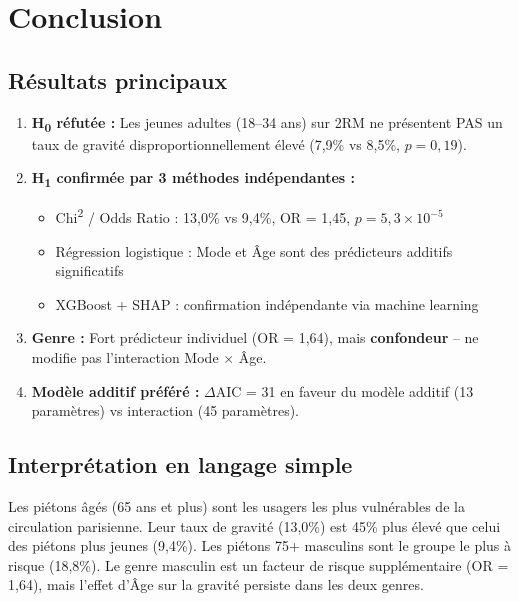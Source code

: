 \documentclass[12pt,a4paper]{article}
\begin{document}
\section{Conclusion}

\subsection{R\'{e}sultats principaux}

\begin{enumerate}[label=\textbf{\arabic*.}]
  \item \textbf{H\textsubscript{0} r\'{e}fut\'{e}e :} Les jeunes adultes
        (18--34 ans) sur 2RM ne pr\'{e}sentent PAS un taux de gravité
        disproportionnellement \'{e}lev\'{e} (7,9\% vs 8,5\%, $p = 0,19$).

  \item \textbf{H\textsubscript{1} confirm\'{e}e par 3 m\'{e}thodes
        ind\'{e}pendantes :}
        \begin{itemize}
          \item Chi\textsuperscript{2} / Odds Ratio : 13,0\% vs 9,4\%,
                OR = 1,45, $p = 5,3 \times 10^{-5}$
          \item R\'{e}gression logistique : Mode et \^Age sont des
                pr\'{e}dicteurs additifs significatifs
          \item XGBoost + SHAP : confirmation ind\'{e}pendante via
                machine learning
        \end{itemize}

  \item \textbf{Genre :} Fort pr\'{e}dicteur individuel (OR = 1,64),
        mais \textbf{confondeur} -- ne modifie pas l'interaction
        Mode $\times$ \^Age.

  \item \textbf{Mod\`{e}le additif pr\'{e}f\'{e}r\'{e} :}
        $\Delta$AIC = 31 en faveur du mod\`{e}le additif (13 param\`{e}tres)
        vs interaction (45 param\`{e}tres).
\end{enumerate}

\subsection{Interprétation en langage simple}

Les piétons \^{a}gés (65 ans et plus) sont les usagers les plus vulnérables
de la circulation parisienne. Leur taux de gravité (13,0\%) est 45\% plus
\'{e}lev\'{e} que celui des piétons plus jeunes (9,4\%). Les piétons 75+ masculins
sont le groupe le plus à risque (18,8\%). Le genre masculin est un facteur
de risque supplémentaire (OR = 1,64), mais l'effet d'\^Age sur la gravité
persiste dans les deux genres.
\end{document}
